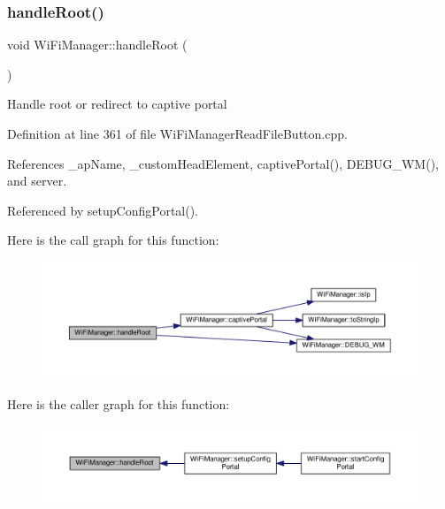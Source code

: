\subsubsection{\texorpdfstring{handle\+Root()}{handleRoot()}}
{\footnotesize\ttfamily void Wi\+Fi\+Manager\+::handle\+Root (\begin{DoxyParamCaption}{ }\end{DoxyParamCaption})\hspace{0.3cm}{\ttfamily [private]}}

Handle root or redirect to captive portal 

Definition at line 361 of file Wi\+Fi\+Manager\+Read\+File\+Button.\+cpp.



References \+\_\+ap\+Name, \+\_\+custom\+Head\+Element, captive\+Portal(), D\+E\+B\+U\+G\+\_\+\+W\+M(), and server.



Referenced by setup\+Config\+Portal().

Here is the call graph for this function\+:
\nopagebreak
\begin{figure}[H]
\begin{center}
\leavevmode
\includegraphics[width=350pt]{d4/dc8/class_wi_fi_manager_a47e4c7df7478f690c53ff9f5125c9760_cgraph}
\end{center}
\end{figure}
Here is the caller graph for this function\+:
\nopagebreak
\begin{figure}[H]
\begin{center}
\leavevmode
\includegraphics[width=350pt]{d4/dc8/class_wi_fi_manager_a47e4c7df7478f690c53ff9f5125c9760_icgraph}
\end{center}
\end{figure}
\mbox{\label{class_wi_fi_manager_a57a9048175c1918340ab9d0a2c53601f}} 
